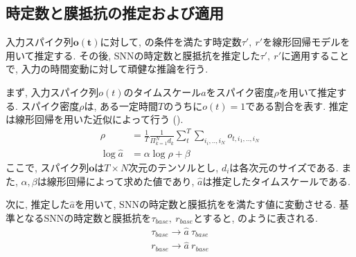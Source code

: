 \makeatletter %
\subsection{時定数と膜抵抗の推定および適用}
入力スパイク列$\bm{o(t)}$に対して, の条件を満たす時定数$\tau',~r'$を線形回帰モデルを用いて推定する.
その後, SNNの時定数と膜抵抗を推定した$\tau',~r'$に適用することで, 入力の時間変動に対して頑健な推論を行う.

まず, 入力スパイク列$o(t)$のタイムスケール$a$をスパイク密度$\rho$を用いて推定する.
スパイク密度$\rho$は, ある一定時間$T$のうちに$o(t)=1$である割合を表す.
推定は線形回帰を用いた近似によって行う ().
\begin{equation}
    \begin{split}
        \rho&=\frac{1}{T} \frac{1}{\Pi_{k=1}^{N}d_k} \sum_t^T \sum_{i_i,..,i_N}o_{t,i_1,..,i_N}\\
        \log{\hat{a}}&=\alpha \log{\rho} + \beta
    \end{split}
    \label{sec2:eq:reg}
\end{equation}
ここで, スパイク列$\bm{o}$は$T \times N$次元のテンソルとし, $d_i$は各次元のサイズである.
また, $\alpha, \beta$は線形回帰によって求めた値であり, $\hat{a}$は推定したタイムスケールである.

次に, 推定した$\hat{a}$を用いて, SNNの時定数と膜抵抗をを満たす値に変動させる.
基準となるSNNの時定数と膜抵抗を$\tau_{base},~r_{base}$とすると, のように表される.
\begin{equation}
    \begin{split}
        \tau_{base} \rightarrow \hat{a}~\tau_{base}\\
        r_{base} \rightarrow \hat{a}~r_{base}\\
    \end{split}
    \label{sec2:eq:replace}
\end{equation}
